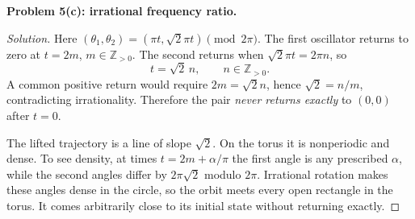 \documentclass[12pt]{amsart}
\theoremstyle{plain}
\theoremstyle{definition}
\theoremstyle{definition}
\theoremstyle{plain}
\newenvironment{solution}
{\begin{proof}[Solution]}
{\end{proof}}
\begin{document}
    \clearpage
    \noindent\textbf{Problem 5(c): irrational frequency ratio.}
    \begin{solution}
    Here $(\theta_1,\theta_2)=(\pi t,\sqrt2\pi t)\pmod{2\pi}$.
    The first oscillator returns to zero at $t=2m$, $m\in\mathbb Z_{>0}$.
    The second returns when $\sqrt2\pi t=2\pi n$, so
    \[
      \boxed{t=\sqrt2\,n,\qquad n\in\mathbb Z_{>0}.}
    \]
    A common positive return would require $2m=\sqrt2 n$, hence
    $\sqrt2=n/m$, contradicting irrationality. Therefore the pair
    \emph{never returns exactly} to $(0,0)$ after $t=0$.

    The lifted trajectory is a line of slope $\sqrt2$. On the torus
    it is nonperiodic and dense. To see density, at times
    $t=2m+\alpha/\pi$ the first angle is any prescribed $\alpha$,
    while the second angles differ by $2\pi\sqrt2$ modulo $2\pi$.
    Irrational rotation makes these angles dense in the circle, so the orbit
    meets every open rectangle in the torus. It comes arbitrarily close to
    its initial state without returning exactly.
    \end{solution}
\end{document}
